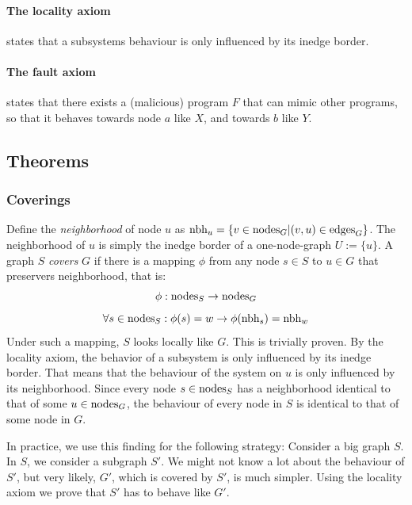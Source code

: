 \paragraph{The locality axiom} states that a subsystems behaviour is only influenced by its inedge border.
\paragraph{The fault axiom} states that there exists a (malicious) program $F$ that can mimic other programs, so that it behaves towards node $a$ like $X$, and towards $b$ like $Y$. 

\subsection{Theorems}

\subsubsection{Coverings}
Define the \emph{neighborhood} of node $u$ as $\text{nbh}_u = \{ v \in  \text{nodes}_{G}  | (v, u) \in  \text{edges}_{G}  \}$. The neighborhood of $u$ is simply the inedge border of a one-node-graph $U := \{u\}$. A graph $S$ \emph{covers} $G$ if there is a mapping $\phi$ from any node $s \in S$ to $u \in G$ that preservers neighborhood, that is: 
$$ \phi:  \text{nodes}_{S}  \to  \text{nodes}_{G}  $$
$$ \forall s \in  \text{nodes}_{S} : \phi(s) = w \to \phi( \text{nbh}_s ) = \text{nbh}_w $$
Under such a mapping, $S$ looks locally like $G$. This is trivially proven. By the locality axiom, the behavior of a subsystem is only influenced by its inedge border. That means that the behaviour of the system on $u$ is only influenced by its neighborhood. Since every node $s \in  \text{nodes}_{S} $ has a neighborhood identical to that of some $u \in  \text{nodes}_{G} $, the behaviour of every node in $S$ is identical to that of some node in $G$.

In practice, we use this finding for the following strategy: Consider a big graph $S$. In $S$, we consider a subgraph $S'$. We might not know a lot about the behaviour of $S'$, but very likely, $G'$, which is covered by $S'$, is much simpler. Using the locality axiom we prove that $S'$ has to behave like $G'$.

